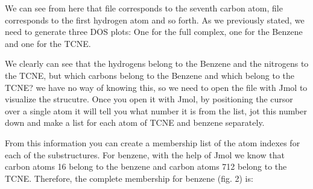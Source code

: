 \documentclass[letterpaper,10pt,english,openany,oneside]{sphinxmanual}
\begin{document}
\begin{sphinxVerbatim}[commandchars=\\\{\}]
                 
                
                
               
                 
                  
                
                 
\end{sphinxVerbatim}

\sphinxAtStartPar
We can see from here that file  corresponds to the seventh carbon atom, file  corresponds to the first hydrogen atom and so forth. As we previously stated, we need to generate three DOS plots: One for the full complex, one for the Benzene and one for the TCNE.

\sphinxAtStartPar
We clearly can see that the hydrogens belong to the Benzene and the nitrogens to the TCNE, but which carbons belong to the Benzene and which belong to the TCNE? we have no way of knowing this, so we need to open the  file with Jmol to visualize the strucutre. Once you open it with Jmol, by positioning the cursor over a single atom it will tell you what number it is from the list, jot this number down and make a list for each atom of TCNE and benzene separately.

\sphinxAtStartPar
From this information you can create a membership list of the atom indexes for each of the substructures. For benzene, with the help of Jmol we know that carbon atoms 1\sphinxhyphen{}6 belong to the benzene and carbon atoms 7\sphinxhyphen{}12 belong to the TCNE. Therefore, the complete membership for benzene (fig. 2) is:
\end{document}
